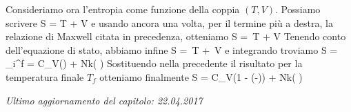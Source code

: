 Consideriamo ora l'entropia come funzione della coppia $(T,V)$. Possiamo scrivere
\be
\de S = \de T + \de V
\ee
e usando ancora una volta, per il termine più a destra, la relazione di Maxwell citata in precedenza, otteniamo
\be
\de S = \,\de T + \de V
\ee
Tenendo conto dell'equazione di stato, abbiamo infine
\be
\de S = \,\de T + \,\de V
\ee
e integrando troviamo
\be
\Delta S = \int_i^f = C_V\ln\left(\right) + 
Nk\ln\left( \right)
\ee
Sostituendo nella precedente il risultato per la temperatura finale $T_f$ otteniamo finalmente
\be
\Delta S = C_V\ln\left(1 - \left(-\right)\right)
+ Nk\ln\left( \right)
\ee


\vskip 0.75cm
\begin{flushright}
{\em Ultimo aggiornamento del capitolo: 22.04.2017}
\end{flushright}